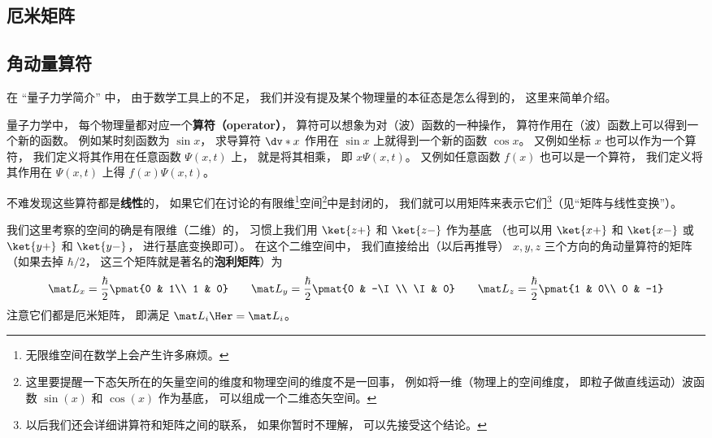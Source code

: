 \subsection{厄米矩阵}






\subsection{角动量算符}
在 “量子力学简介” 中， 由于数学工具上的不足， 我们并没有提及某个物理量的本征态是怎么得到的， 这里来简单介绍。

量子力学中， 每个物理量都对应一个\textbf{算符（operator）}， 算符可以想象为对（波）函数的一种操作， 算符作用在（波）函数上可以得到一个新的函数。 例如某时刻函数为 $\sin x$， 求导算符 $\dv*{x}$ 作用在 $\sin x$ 上就得到一个新的函数 $\cos x$。 又例如坐标 $x$ 也可以作为一个算符， 我们定义将其作用在任意函数 $\Psi(x, t)$ 上， 就是将其相乘， 即 $x\Psi(x, t)$。 又例如任意函数 $f(x)$ 也可以是一个算符， 我们定义将其作用在 $\Psi(x, t)$ 上得 $f(x)\Psi(x, t)$。

不难发现这些算符都是\textbf{线性}的， 如果它们在讨论的有限维\footnote{无限维空间在数学上会产生许多麻烦。}空间\footnote{这里要提醒一下态矢所在的矢量空间的维度和物理空间的维度不是一回事， 例如将一维（物理上的空间维度， 即粒子做直线运动）波函数 $\sin(x)$ 和 $\cos(x)$ 作为基底， 可以组成一个二维态矢空间。}中是封闭的， 我们就可以用矩阵来表示它们\footnote{以后我们还会详细讲算符和矩阵之间的联系， 如果你暂时不理解， 可以先接受这个结论。}（见“矩阵与线性变换”）。%

我们这里考察的空间的确是有限维（二维）的， 习惯上我们用 $\ket{z+}$ 和 $\ket{z-}$ 作为基底 （也可以用 $\ket{x+}$ 和 $\ket{x-}$ 或 $\ket{y+}$ 和 $\ket{y-}$， 进行基底变换即可）。 在这个二维空间中， 我们直接给出（以后再推导） $x, y, z$ 三个方向的角动量算符的矩阵（如果去掉 $\hbar/2$， 这三个矩阵就是著名的\textbf{泡利矩阵}）为
\begin{equation}
\mat L_x = \frac{\hbar}{2}\pmat{0 & 1\\ 1 & 0}
\qquad
\mat L_y = \frac{\hbar}{2}\pmat{0 & -\I \\ \I & 0}
\qquad
\mat L_z = \frac{\hbar}{2}\pmat{1 & 0\\ 0 & -1}
\end{equation}
注意它们都是厄米矩阵， 即满足 $\mat L_i\Her = \mat L_i$。%

